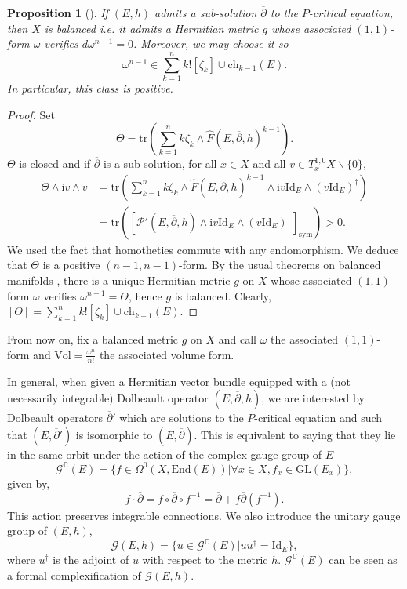 \documentclass{article}
\newtheorem{proposition}[theorem]{Proposition}
\theoremstyle{remark}
\theoremstyle{definition}
\newcommand{\C}{\mathbb{C}}
\newcommand{\End}{\mathrm{End}}
\newcommand{\GL}{\mathrm{GL}}
\newcommand{\tr}{\mathrm{tr}}
\newcommand{\Vol}{\mathrm{Vol}}
\newcommand{\Id}{\mathrm{Id}}
\renewcommand{\i}{\boldsymbol{\mathrm{i}}}
\newcommand{\G}{\mathcal{G}}
\newcommand{\mP}{\mathcal{P}}
\newcommand{\dbar}{\overline{\partial}}
\newcommand{\ch}{\mathrm{ch}}
\newcommand{\sym}{\mathrm{sym}}
\begin{document}
\begin{proposition}[{\cite[Lemma 3.3]{Keller_Scarpa}}]\label{PRO:X équilibrée}
    If $(E,h)$ admits a sub-solution $\dbar$ to the $P$-critical equation, then $X$ is balanced \textit{i.e.} it admits a Hermitian metric $g$ whose associated $(1,1)$-form $\omega$ verifies $d\omega^{n - 1} = 0$. Moreover, we may choose it so
    $$
    \omega^{n - 1} \in \sum_{k = 1}^n k![\zeta_k] \cup \ch_{k - 1}(E).
    $$
    In particular, this class is positive.
\end{proposition}
\begin{proof}
Set
$$
\Theta = \tr\left(\sum_{k = 1}^n k\zeta_k \wedge \hat{F}(E,\dbar,h)^{k - 1}\right).
$$
$\Theta$ is closed and if $\dbar$ is a sub-solution, for all $x \in X$ and all $v \in T_x^{1,0}X\backslash\{0\}$,
\begin{align*}
    \Theta \wedge \i v \wedge \overline{v} & = \tr\left(\sum_{k = 1}^n k\zeta_k \wedge \hat{F}(E,\dbar,h)^{k - 1} \wedge \i v\Id_E \wedge (v\Id_E)^\dagger\right)\\
    & = \tr([\mP'(E,\dbar,h) \wedge \i v\Id_E \wedge (v\Id_E)^\dagger]_\sym) > 0.
\end{align*}
We used the fact that homotheties commute with any endomorphism. We deduce that $\Theta$ is a positive $(n - 1,n - 1)$-form. By the usual theorems on balanced manifolds \cite{Michelsohn}, there is a unique Hermitian metric $g$ on $X$ whose associated $(1,1)$-form $\omega$ verifies $\omega^{n - 1} = \Theta$, hence $g$ is balanced. Clearly, $[\Theta] = \sum_{k = 1}^n k![\zeta_k] \cup \ch_{k - 1}(E)$.
\end{proof}

From now on, fix a balanced metric $g$ on $X$ and call $\omega$ the associated $(1,1)$-form and $\Vol = \frac{\omega^n}{n!}$ the associated volume form.

In general, when given a Hermitian vector bundle equipped with a (not necessarily integrable) Dolbeault operator $(E,\dbar,h)$, we are interested by Dolbeault operators $\dbar'$ which are solutions to the $P$-critical equation and such that $(E,\dbar')$ is isomorphic to $(E,\dbar)$. This is equivalent to saying that they lie in the same orbit under the action of the complex gauge group of $E$
$$
\G^\C(E) = \{f \in \Omega^0(X,\End(E))|\forall x \in X, f_x \in \GL(E_x)\},
$$
given by,
$$
f \cdot \dbar = f \circ \dbar \circ f^{-1} = \dbar + f\dbar(f^{-1}).
$$
This action preserves integrable connections. We also introduce the unitary gauge group of $(E,h)$,
$$
\G(E,h) = \{u \in \G^\C(E)|uu^\dagger = \Id_E\},
$$
where $u^\dagger$ is the adjoint of $u$ with respect to the metric $h$. $\G^\C(E)$ can be seen as a formal complexification of $\G(E,h)$.
\end{document}
